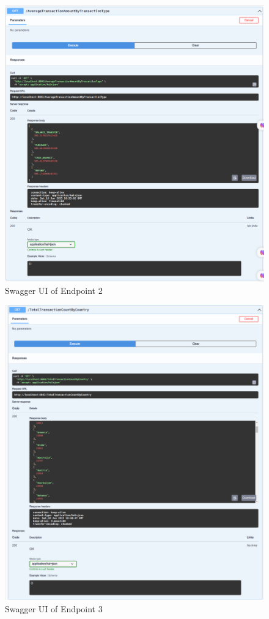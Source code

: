 \begin{figure}[H]
\centering
\includegraphics[width=\linewidth]{images/Swagger-UI-2.png}
\caption{Swagger UI of Endpoint 2}\label{fig:swagger-2}
\end{figure}

\begin{figure}[H]
\centering
\includegraphics[width=\linewidth]{images/Swagger-UI.png}
\caption{Swagger UI of Endpoint 3}\label{fig:swagger-3}
\end{figure}

